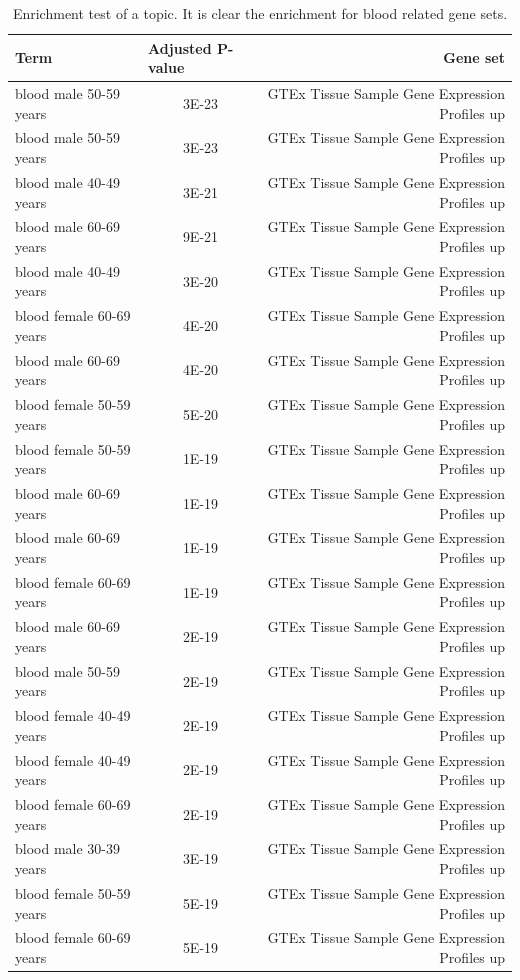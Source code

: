 \begin{table}[htb!]
	\centering
	\tiny
	\begin{tabular}{|l|c|r|}
		\hline
		Term & \multicolumn{1}{l|}{Adjusted P-value} & Gene set \\ \hline
		blood male 50-59 years & 3E-23 & GTEx Tissue Sample Gene Expression Profiles up \\ \hline
		blood male 50-59 years & 3E-23 & GTEx Tissue Sample Gene Expression Profiles up \\ \hline
		blood male 40-49 years & 3E-21 & GTEx Tissue Sample Gene Expression Profiles up \\ \hline
		blood male 60-69 years & 9E-21 & GTEx Tissue Sample Gene Expression Profiles up \\ \hline
		blood male 40-49 years & 3E-20 & GTEx Tissue Sample Gene Expression Profiles up \\ \hline
		blood female 60-69 years & 4E-20 & GTEx Tissue Sample Gene Expression Profiles up \\ \hline
		blood male 60-69 years & 4E-20 & GTEx Tissue Sample Gene Expression Profiles up \\ \hline
		blood female 50-59 years & 5E-20 & GTEx Tissue Sample Gene Expression Profiles up \\ \hline
		blood female 50-59 years & 1E-19 & GTEx Tissue Sample Gene Expression Profiles up \\ \hline
		blood male 60-69 years & 1E-19 & GTEx Tissue Sample Gene Expression Profiles up \\ \hline
		blood male 60-69 years & 1E-19 & GTEx Tissue Sample Gene Expression Profiles up \\ \hline
		blood female 60-69 years & 1E-19 & GTEx Tissue Sample Gene Expression Profiles up \\ \hline
		blood male 60-69 years & 2E-19 & GTEx Tissue Sample Gene Expression Profiles up \\ \hline
		blood male 50-59 years & 2E-19 & GTEx Tissue Sample Gene Expression Profiles up \\ \hline
		blood female 40-49 years & 2E-19 & GTEx Tissue Sample Gene Expression Profiles up \\ \hline
		blood female 40-49 years & 2E-19 & GTEx Tissue Sample Gene Expression Profiles up \\ \hline
		blood female 60-69 years & 2E-19 & GTEx Tissue Sample Gene Expression Profiles up \\ \hline
		blood male 30-39 years & 3E-19 & GTEx Tissue Sample Gene Expression Profiles up \\ \hline
		blood female 50-59 years & 5E-19 & GTEx Tissue Sample Gene Expression Profiles up \\ \hline
		blood female 60-69 years & 5E-19 & GTEx Tissue Sample Gene Expression Profiles up \\ \hline
	\end{tabular}
	\label{tab:topic/enrich/blood}
	\caption{Enrichment test of a topic. It is clear the enrichment for blood related gene sets.}
\end{table}
